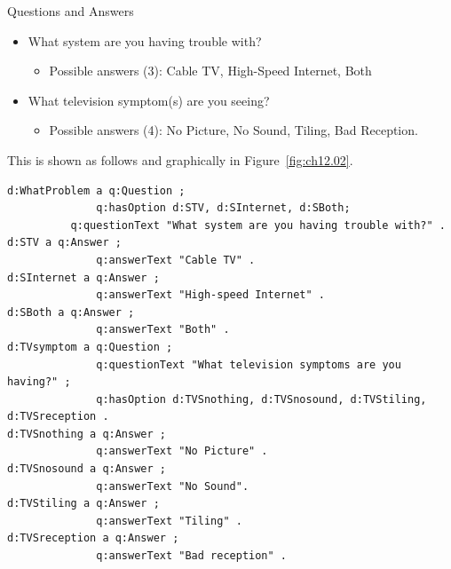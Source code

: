 \begin{example}{Questions and Answers}
\begin{itemize}
\item What system are you having trouble with?
\begin{itemize}
\item Possible answers (3): Cable TV, High-Speed Internet, Both
\end{itemize}

\item What television symptom(s) are you seeing?
\begin{itemize}
\item Possible answers (4): No Picture, No Sound, Tiling, Bad Reception.
\end{itemize}
\end{itemize}


This is shown as follows and graphically in Figure~\ref{fig:ch12.02}.

\begin{lstlisting}
d:WhatProblem a q:Question ;
              q:hasOption d:STV, d:SInternet, d:SBoth;  
	      q:questionText "What system are you having trouble with?" .
d:STV a q:Answer ;
              q:answerText "Cable TV" .
d:SInternet a q:Answer ;
              q:answerText "High-speed Internet" .
d:SBoth a q:Answer ;
              q:answerText "Both" .
d:TVsymptom a q:Question ;
              q:questionText "What television symptoms are you having?" ;
              q:hasOption d:TVSnothing, d:TVSnosound, d:TVStiling, d:TVSreception .
d:TVSnothing a q:Answer ;
              q:answerText "No Picture" .
d:TVSnosound a q:Answer ;
              q:answerText "No Sound".  
d:TVStiling a q:Answer ;
              q:answerText "Tiling" .
d:TVSreception a q:Answer ;
              q:answerText "Bad reception" .
\end{lstlisting}


\end{example}
